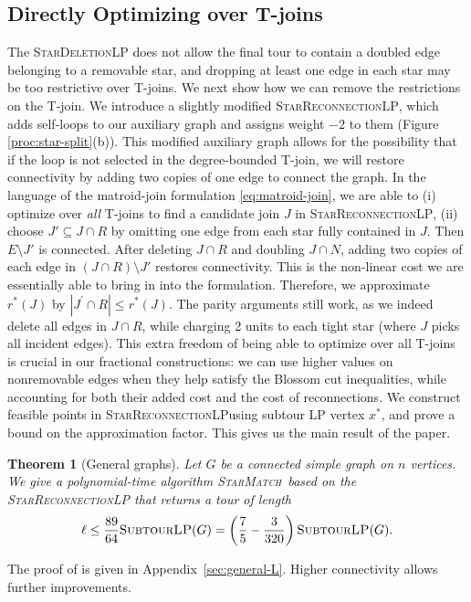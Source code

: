 \documentclass[11pt]{amsart}
\newcommand{\1}{\mathbbm{1}}
\newcommand{\ALG}{\textsc{StarMatch}}
\newcommand{\SubtourLP}{\textsc{SubtourLP}}
\newcommand{\LPone}{\textsc{StarDeletionLP}}
\newcommand{\LPtwo}{\textsc{StarReconnectionLP}}
\newtheorem{theorem}{Theorem}[section]
\begin{document}
\subsection{Directly Optimizing over T-joins} The \LPone{} does not allow the final tour to contain
a doubled edge belonging to a removable star, and dropping at least one edge in each star may be too restrictive over T-joins. {We next show how we can remove the restrictions on the T-join.} We introduce a slightly modified \LPtwo{}, which adds
self-loops to our auxiliary graph and assigns weight $-2$ to them (Figure \ref{proc:star-split}(b)). This modified auxiliary graph allows for the possibility that if the loop is not selected in the degree-bounded T-join, we will restore connectivity by adding two copies of one edge to connect the graph. {In the language of the matroid-join formulation \eqref{eq:matroid-join}, we are able to (i) optimize over {\it all} T-joins to find a candidate join $J$ in \LPtwo, (ii) choose $J'\subseteq J\cap R$ by omitting one edge from
each star fully contained in $J$. Then $E\setminus J'$ is
connected. After deleting $J\cap R$ and doubling $J\cap N$,
adding two copies of each edge in $(J\cap R)\setminus J'$
restores connectivity. This is the non-linear cost we are essentially able to bring in into the formulation.  Therefore, we approximate $r^*(J)$ by $|J^\prime \cap R| \leq r^*(J)$. The parity arguments still work, as we indeed delete all edges in $J \cap R$, while charging 2 units to each tight star (where $J$ picks all incident edges). This extra freedom of being able to optimize over all T-joins is crucial in our fractional constructions: we can use higher values on nonremovable edges when they help
satisfy the Blossom cut inequalities, while accounting for both
their added cost and the cost of reconnections. We construct feasible points in \LPtwo using subtour LP vertex $x^*$, and prove a bound on the approximation factor. This gives us the main result} of the paper.



\begin{theorem}[General graphs]
\label{thm:intro-general}
{Let $G$ be a connected simple graph on $n$ vertices.}
We give a polynomial-time
algorithm \ALG\  based on the \LPtwo{} that returns a tour of length
\[
 \ell\le\frac{89}{64}{\text{\SubtourLP}(G)}
       =\left(\frac75-\frac3{320}\right){\text{\SubtourLP}(G)}.
\]
\end{theorem}
The proof of  is given in Appendix~\ref{sec:general-L}.
Higher connectivity allows further improvements.
\end{document}
